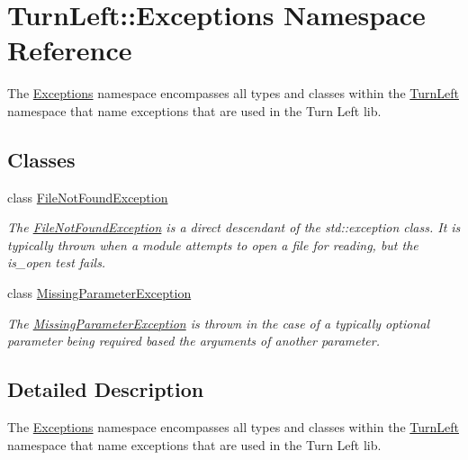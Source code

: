 \hypertarget{namespaceTurnLeft_1_1Exceptions}{
\section{TurnLeft::Exceptions Namespace Reference}
\label{namespaceTurnLeft_1_1Exceptions}
}


The \hyperlink{namespaceTurnLeft_1_1Exceptions}{Exceptions} namespace encompasses all types and classes within the \hyperlink{namespaceTurnLeft}{TurnLeft} namespace that name exceptions that are used in the Turn Left lib.  


\subsection*{Classes}
\begin{DoxyCompactItemize}
\item 
class \hyperlink{classTurnLeft_1_1Exceptions_1_1FileNotFoundException}{FileNotFoundException}
\begin{DoxyCompactList}\small\item\em The \hyperlink{classTurnLeft_1_1Exceptions_1_1FileNotFoundException}{FileNotFoundException} is a direct descendant of the std::exception class. It is typically thrown when a module attempts to open a file for reading, but the is\_\-open test fails. \item\end{DoxyCompactList}\item 
class \hyperlink{classTurnLeft_1_1Exceptions_1_1MissingParameterException}{MissingParameterException}
\begin{DoxyCompactList}\small\item\em The \hyperlink{classTurnLeft_1_1Exceptions_1_1MissingParameterException}{MissingParameterException} is thrown in the case of a typically optional parameter being required based the arguments of another parameter. \item\end{DoxyCompactList}\end{DoxyCompactItemize}


\subsection{Detailed Description}
The \hyperlink{namespaceTurnLeft_1_1Exceptions}{Exceptions} namespace encompasses all types and classes within the \hyperlink{namespaceTurnLeft}{TurnLeft} namespace that name exceptions that are used in the Turn Left lib. 